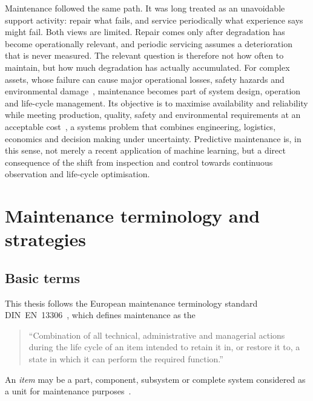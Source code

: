 \documentclass{book}
\begin{document}
Maintenance followed the same path. It was long treated as an unavoidable
support activity: repair what fails, and service periodically what experience
says might fail. Both views are limited. Repair comes only after degradation
has become operationally relevant, and periodic servicing assumes a
deterioration that is never measured. The relevant question is therefore not
how often to maintain, but how much degradation has actually accumulated.
For complex assets, whose failure can cause major operational losses, safety
hazards and environmental damage~\cite{KobbacyMurthy2008}, maintenance becomes
part of system design, operation and life-cycle management. Its objective is
to maximise availability and reliability while meeting production, quality,
safety and environmental requirements at an acceptable
cost~\cite{PintelonParodiHerz2008}, a systems problem that combines
engineering, logistics, economics and decision making under uncertainty.
Predictive maintenance is, in this sense, not merely a recent application of
machine learning, but a direct consequence of the shift from inspection and
control towards continuous observation and life-cycle optimisation.

\section{Maintenance terminology and strategies}
\label{sec:pdm_terms}

\subsection{Basic terms}

This thesis follows the European maintenance terminology standard
DIN~EN~13306~\cite{DINEN13306,Strunz2012}, which defines maintenance as the
\begin{quote}
``Combination of all technical, administrative and managerial actions during
the life cycle of an item intended to retain it in, or restore it to, a state
in which it can perform the required function.''
\end{quote}
An \emph{item} may be a part, component, subsystem or complete system
considered as a unit for maintenance purposes~\cite{DINEN13306}.
\end{document}
